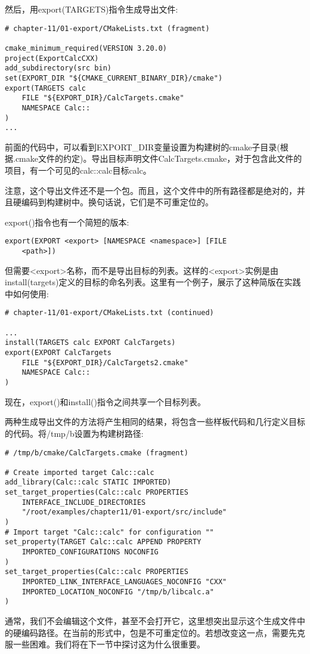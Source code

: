 然后，用export(TARGETS)指令生成导出文件:

\begin{lstlisting}[style=styleCMake]
# chapter-11/01-export/CMakeLists.txt (fragment)

cmake_minimum_required(VERSION 3.20.0)
project(ExportCalcCXX)
add_subdirectory(src bin)
set(EXPORT_DIR "${CMAKE_CURRENT_BINARY_DIR}/cmake")
export(TARGETS calc
	FILE "${EXPORT_DIR}/CalcTargets.cmake"
	NAMESPACE Calc::
)
...
\end{lstlisting}

前面的代码中，可以看到EXPORT\_DIR变量设置为构建树的cmake子目录(根据.cmake文件的约定)。导出目标声明文件CalcTargets.cmake，对于包含此文件的项目，有一个可见的calc::calc目标calc。

注意，这个导出文件还不是一个包。而且，这个文件中的所有路径都是绝对的，并且硬编码到构建树中。换句话说，它们是不可重定位的。

export()指令也有一个简短的版本:

\begin{lstlisting}[style=styleCMake]
export(EXPORT <export> [NAMESPACE <namespace>] [FILE
	<path>])
\end{lstlisting}

但需要<export>名称，而不是导出目标的列表。这样的<export>实例是由install(targets)定义的目标的命名列表。这里有一个例子，展示了这种简版在实践中如何使用:

\begin{lstlisting}[style=styleCMake]
# chapter-11/01-export/CMakeLists.txt (continued)

...
install(TARGETS calc EXPORT CalcTargets)
export(EXPORT CalcTargets
	FILE "${EXPORT_DIR}/CalcTargets2.cmake"
	NAMESPACE Calc::
)
\end{lstlisting}

现在，export()和install()指令之间共享一个目标列表。

两种生成导出文件的方法将产生相同的结果，将包含一些样板代码和几行定义目标的代码。将/tmp/b设置为构建树路径:

\begin{lstlisting}[style=styleCMake]
# /tmp/b/cmake/CalcTargets.cmake (fragment)

# Create imported target Calc::calc
add_library(Calc::calc STATIC IMPORTED)
set_target_properties(Calc::calc PROPERTIES
	INTERFACE_INCLUDE_DIRECTORIES
	"/root/examples/chapter11/01-export/src/include"
)
# Import target "Calc::calc" for configuration ""
set_property(TARGET Calc::calc APPEND PROPERTY
	IMPORTED_CONFIGURATIONS NOCONFIG
)
set_target_properties(Calc::calc PROPERTIES
	IMPORTED_LINK_INTERFACE_LANGUAGES_NOCONFIG "CXX"
	IMPORTED_LOCATION_NOCONFIG "/tmp/b/libcalc.a"
)
\end{lstlisting}

通常，我们不会编辑这个文件，甚至不会打开它，这里想突出显示这个生成文件中的硬编码路径。在当前的形式中，包是不可重定位的。若想改变这一点，需要先克服一些困难。我们将在下一节中探讨这为什么很重要。












